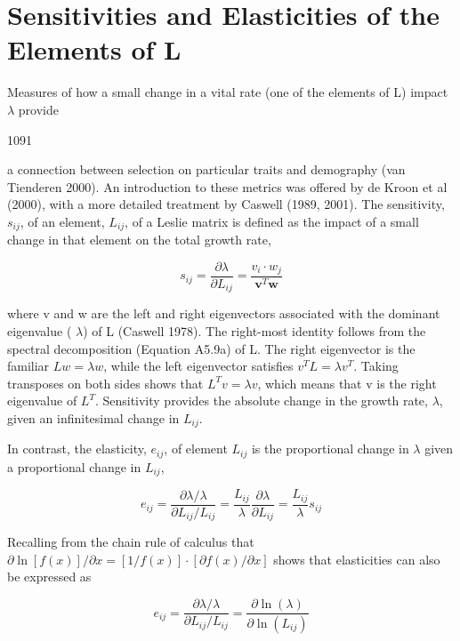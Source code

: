 \documentclass{article}
\begin{document}
\section{Sensitivities and Elasticities of the Elements of L}
Measures of how a small change in a vital rate (one of the elements of L) impact  $ \lambda $ provide

1091

a connection between selection on particular traits and demography (van Tienderen 2000). An introduction to these metrics was offered by de Kroon et al (2000), with a more detailed treatment by Caswell (1989, 2001). The sensitivity,  $ s_{ij} $, of an element,  $ L_{ij} $, of a Leslie matrix is defined as the impact of a small change in that element on the total growth rate,

\begin{equation}
s_{ij}=\frac{\partial\lambda}{\partial L_{ij}}=\frac{v_{i}\cdot w_{j}}{\mathbf{v}^{T}\mathbf{w}}
\tag{29.4a}
\label{eq:29_4a}
\end{equation}

where v and w are the left and right eigenvectors associated with the dominant eigenvalue ( $ \lambda $) of L (Caswell 1978). The right-most identity follows from the spectral decomposition (Equation A5.9a) of L. The right eigenvector is the familiar  $ Lw = \lambda w $, while the left eigenvector satisfies  $ v^T L = \lambda v^T $. Taking transposes on both sides shows that  $ L^T v = \lambda v $, which means that v is the right eigenvalue of  $ L^T $. Sensitivity provides the absolute change in the growth rate,  $ \lambda $, given an infinitesimal change in  $ L_{ij} $.

In contrast, the elasticity,  $ e_{ij} $, of element  $ L_{ij} $ is the proportional change in  $ \lambda $ given a proportional change in  $ L_{ij} $,

\begin{equation}
e_{ij}=\frac{\partial\lambda/\lambda}{\partial L_{ij}/L_{ij}}=\frac{L_{ij}}{\lambda}\frac{\partial\lambda}{\partial L_{ij}}=\frac{L_{ij}}{\lambda}s_{ij}
\tag{29.4b}
\label{eq:29_4b}
\end{equation}

Recalling from the chain rule of calculus that  $ \partial\ln[f(x)]/\partial x = [1/f(x)] \cdot [\partial f(x)/\partial x] $ shows that elasticities can also be expressed as

\begin{equation}
e_{ij}=\frac{\partial\lambda/\lambda}{\partial L_{ij}/L_{ij}}=\frac{\partial\ln(\lambda)}{\partial\ln(L_{ij})}
\tag{29.4c}
\label{eq:29_4c}
\end{equation}
\end{document}
